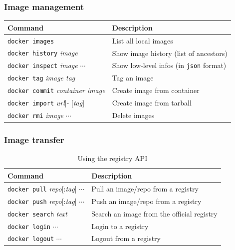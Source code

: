 \documentclass[aspectratio=169]{beamer}
\begin{document}
\begin{frame}
\frametitle{Image management}
	\begin{table}[hbp]
		\center
		\begin{tabular}{lp{21em}}
			\toprule
			\textbf{Command} & \textbf{Description} \\
			\midrule
			\texttt{docker\ images} & List all local images \\
			\texttt{docker\ history} \textit{image} & Show image history (list of ancestors) \\
			\texttt{docker\ inspect} \textit{image} $\cdots$ & Show low-level infos (in \texttt{json} format) \\
			\midrule
			\texttt{docker\ tag} \textit{image tag} & Tag an image \\
			\midrule
			\texttt{docker\ commit} \textit{container image} & Create image from container \\
			\texttt{docker\ import} \textit{url}|- [\textit{tag}] & Create image from tarball \\
			\midrule
			\texttt{docker\ rmi} \textit{image} $\cdots$ & Delete images \\
			\bottomrule
		\end{tabular}
	\end{table}
\end{frame}

\begin{frame}
\frametitle{Image transfer}
	\begin{table}[hbp]
		\center
		\begin{tabular}{lp{21em}}
			\toprule
			\textbf{Command} & \textbf{Description} \\
			\midrule
			\texttt{docker pull} \textit{repo}[:\textit{tag}] $\cdots$
				& Pull an image/repo from a registry \\
			\texttt{docker push} \textit{repo}[:\textit{tag}] $\cdots$
				& Push an image/repo from a registry \\
			\texttt{docker search} \textit{text}
				& Search an image from the official registry \\
			\midrule
			\texttt{docker login} $\cdots$ & Login to a registry \\
			\texttt{docker logout} $\cdots$ & Logout from a registry \\
			\bottomrule
		\end{tabular}
		\caption{Using the registry API}
	\end{table}
\end{frame}
\end{document}
